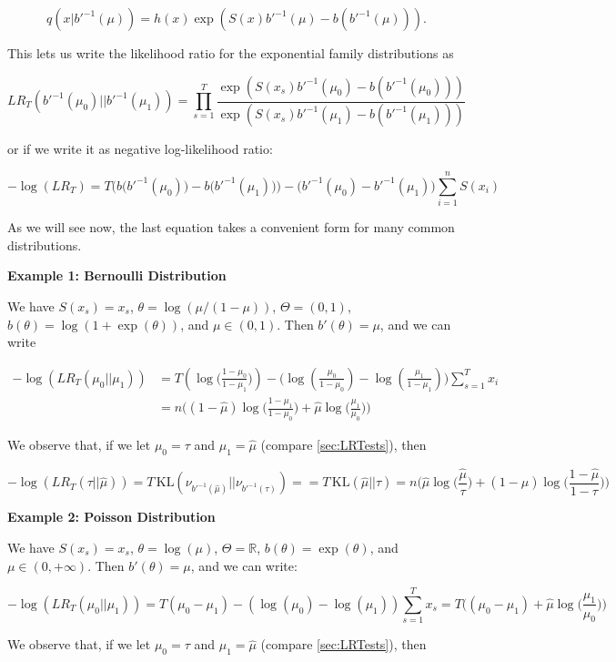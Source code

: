 \documentclass[11pt,]{article}
\newcommand{\KL}{\,\text{KL}}
\begin{document}
\[
q(x|b'^{-1}(\mu)) = h(x) \exp(S(x) b'^{-1}(\mu) - b(b'^{-1}(\mu))).
\]

This lets us write the likelihood ratio for the exponential family
distributions as

\[
LR_T(b'^{-1}(\mu_0)||b'^{-1}(\mu_1)) = \prod_{s=1}^T \frac{\exp(S(x_s) b'^{-1}(\mu_0) - b(b'^{-1}(\mu_0)))}{\exp(S(x_s) b'^{-1}(\mu_1) - b(b'^{-1}(\mu_1)))}
\]

or if we write it as negative log-likelihood ratio:

\[
-\log(LR_T) = T\Big(b\big(b'^{-1}(\mu_0)) - b(b'^{-1}(\mu_1)\big)\Big) - \Big(b'^{-1}(\mu_0)-b'^{-1}(\mu_1)\Big)\sum_{i=1}^nS(x_i)
\]

As we will see now, the last equation takes a convenient form for many
common distributions.

\textbf{Example 1: Bernoulli Distribution}

We have \(S(x_s) = x_s\), \(\theta = \log(\mu/(1-\mu))\),
\(\Theta = (0,1)\), \(b(\theta) = \log(1+\exp(\theta))\), and
\(\mu \in (0,1)\). Then \(b'(\theta) = \mu\), and we can write

\begin{align*}
-\log(LR_T(\mu_0||\mu_1)) & = T(\log\Big(\frac{1-\mu_0}{1-\mu_1}\Big)) - \Big(\log(\frac{\mu_0}{1-\mu_0}) - \log(\frac{\mu_1}{1-\mu_1})\Big)\sum_{s=1}^{T}x_i \\
& = n \Big( (1-\hat{\mu})\log\Big(\frac{1-\mu_1}{1-\mu_0}\Big) + \hat{\mu}\log\Big(\frac{\mu_1}{\mu_0}) \Big)
\end{align*}

We observe that, if we let \(\mu_0 = \tau\) and \(\mu_1 = \hat{\mu}\)
(compare \autoref{sec:LRTests}), then

\[
-\log(LR_T(\tau||\hat{\mu})) = T\KL(\nu_{b'^{-1}(\hat{\mu})}||\nu_{b'^{-1}(\tau)}) =  = T \KL(\hat{\mu}||\tau) = n \Big(\hat{\mu}\log\big(\frac{\hat{\mu}}{\tau}\big) + (1-\hat{\mu})\log\big(\frac{1-\hat{\mu}}{1-\tau}\big)\Big)
\]

\textbf{Example 2: Poisson Distribution}

We have \(S(x_s) = x_s\), \(\theta = \log(\mu)\),
\(\Theta = \mathbb{R}\), \(b(\theta) = \exp(\theta)\), and
\(\mu \in (0, +\infty)\). Then \(b'(\theta) = \mu\), and we can write:

\[
-\log(LR_T(\mu_0||\mu_1)) = T(\mu_0 - \mu_1) - (\log(\mu_0) - \log(\mu_1))\sum_{s=1}^T x_s = T\Big((\mu_0 - \mu_1) + \hat{\mu}\log\Big(\frac{\mu_1}{\mu_0}\Big)\Big)
\]

We observe that, if we let \(\mu_0 = \tau\) and \(\mu_1 = \hat{\mu}\)
(compare \autoref{sec:LRTests}), then
\end{document}
